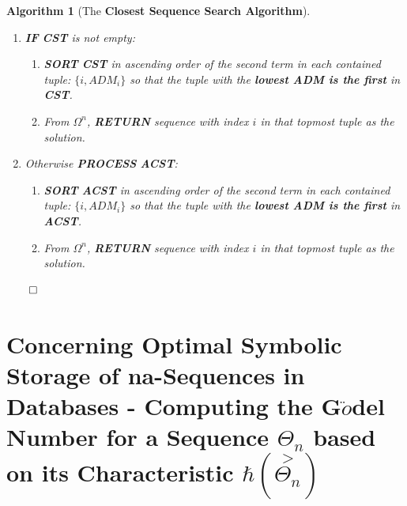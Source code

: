 \documentclass[a4paper, 18pt]{book} %
\newtheorem{alg}{Algorithm}
\begin{document}
\begin{alg}[The \textbf{Closest Sequence Search Algorithm}]
\begin{enumerate}
{\begin{enumerate}
{\begin{enumerate}
{			}
		\end{enumerate}			
	}
	\item \textbf{ELSE}/Otherwise:{
	 \begin{enumerate}
	 		\item \textbf{ADJUST} $\psi^*(\Omega_i)$ and $\psi^*(Q_k)$ to eliminate uncommon terms and derive temporary approximations $\approx \psi^*(\Omega_i)$ and $\approx \psi^*(Q_k))$ from them.
			\item \textbf{COMPUTE} $\tilde{A}(\approx \psi^*(\Omega_i) \rightarrow \approx \psi^*(Q_k))$ and store that in \textbf{ADM\_i}
			\item{ \textbf{IFF} \textbf{ADM\_i} $<$ \textbf{ADM\_ACST}: 
			\begin{enumerate}
			\item \textbf{add tuple} $\{i, ADM_i\}$ to \textbf{ACST}.
			\item \textbf{UPDATE}: \textbf{ADM\_ACST} := \textbf{ADM\_i}.
			\end{enumerate}
			
			}
		\end{enumerate}			
	}	
	\end{enumerate}
}
\item {\textbf{IF} \textbf{CST} is not empty:
	\begin{enumerate}
	\item \textbf{SORT}  \textbf{CST} in ascending order of the second term in each contained tuple: $\{i, ADM_i\}$ so that the tuple with the \textbf{lowest ADM is the first} in \textbf{CST}.
	\item From  $\Omega^n$, \textbf{RETURN} sequence with index $i$ in that topmost tuple as the solution.
	\end{enumerate}
}
\item {Otherwise \textbf{PROCESS} \textbf{ACST}:
	\begin{enumerate}
	\item \textbf{SORT}  \textbf{ACST} in ascending order of the second term in each contained tuple: $\{i, ADM_i\}$ so that the tuple with the \textbf{lowest ADM is the first} in \textbf{ACST}.
	\item From  $\Omega^n$, \textbf{RETURN} sequence with index $i$ in that topmost tuple as the solution.
	\end{enumerate}
}
\end{enumerate}
$\qed$
\end{alg}
\vspace{1em}

\section{Concerning Optimal Symbolic Storage of na-Sequences in Databases - Computing the G$\ddot{o}$del Number for a Sequence $\Theta_n$ based on its Characteristic $\hbar(\overset{>}{\Theta_n})$ }
\label{SECSEQSTORAGE}
\end{document}
